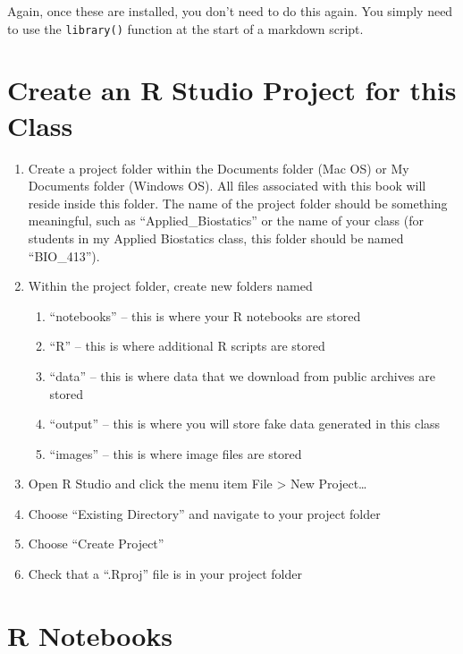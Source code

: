\documentclass[]{book}
\providecommand{\tightlist}{%
  \setlength{\itemsep}{0pt}\setlength{\parskip}{0pt}}
\begin{document}
Again, once these are installed, you don't need to do this again. You
simply need to use the \texttt{library()} function at the start of a
markdown script.

\section{Create an R Studio Project for this
Class}\label{create-an-r-studio-project-for-this-class}

\begin{enumerate}
\def\labelenumi{\arabic{enumi}.}
\tightlist
\item
  Create a project folder within the Documents folder (Mac OS) or My
  Documents folder (Windows OS). All files associated with this book
  will reside inside this folder. The name of the project folder should
  be something meaningful, such as ``Applied\_Biostatics'' or the name
  of your class (for students in my Applied Biostatics class, this
  folder should be named ``BIO\_413'').
\item
  Within the project folder, create new folders named

  \begin{enumerate}
  \def\labelenumii{\arabic{enumii}.}
  \tightlist
  \item
    ``notebooks'' -- this is where your R notebooks are stored
  \item
    ``R'' -- this is where additional R scripts are stored
  \item
    ``data'' -- this is where data that we download from public archives
    are stored
  \item
    ``output'' -- this is where you will store fake data generated in
    this class
  \item
    ``images'' -- this is where image files are stored
  \end{enumerate}
\item
  Open R Studio and click the menu item File \textgreater{} New
  Project\ldots{}
\item
  Choose ``Existing Directory'' and navigate to your project folder
\item
  Choose ``Create Project''
\item
  Check that a ``.Rproj'' file is in your project folder
\end{enumerate}

\section{R Notebooks}\label{r-notebooks}
\end{document}
